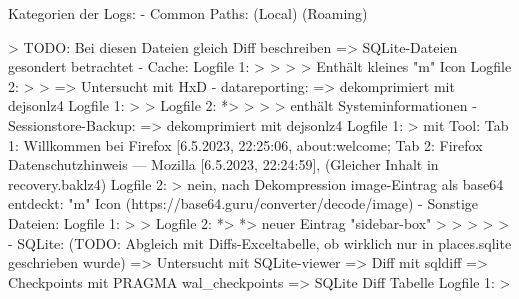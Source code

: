 Kategorien der Logs:
- Common Paths:
	(Local) %
	(Roaming) %

> TODO: Bei diesen Dateien gleich Diff beschreiben => SQLite-Dateien gesondert betrachtet
- Cache: 
	Logfile 1:
		> %
		> %
		> %
		> %
			Enthält kleines "m" Icon
	Logfile 2:
		> %
		> %
			=> Untersucht mit HxD
- datareporting:
	=> dekomprimiert mit dejsonlz4
	Logfile 1:
		> %
		> %
	Logfile 2:
		*> %
		> %
		> %
		> %
			enthält Systeminformationen
- Sessionstore-Backup:
	=> dekomprimiert mit dejsonlz4
	Logfile 1:
		> %
			mit Tool: Tab 1:  Willkommen bei Firefox [6.5.2023, 22:25:06, about:welcome;
			Tab 2:  Firefox Datenschutzhinweis — Mozilla [6.5.2023, 22:24:59], %
			(Gleicher Inhalt in recovery.baklz4)
	Logfile 2:
		> %
			nein, nach Dekompression image-Eintrag als base64 entdeckt: "m" Icon
			(https://base64.guru/converter/decode/image)
- Sonstige Dateien:
	Logfile 1:
		> %
		> %
	Logfile 2:
		*> %
		*> %
			neuer Eintrag "sidebar-box"
		> %
		> %
		> %
		> %
		> %
- SQLite: (TODO: Abgleich mit Diffs-Exceltabelle, ob wirklich nur in places.sqlite geschrieben wurde)
	=> Untersucht mit SQLite-viewer
	=> Diff mit sqldiff
	=> Checkpoints mit PRAGMA wal\_checkpoints
	=> SQLite Diff Tabelle 
	Logfile 1:
		> %
